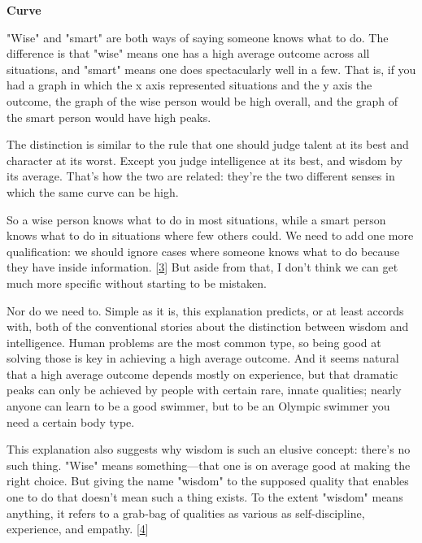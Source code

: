\textbf{Curve}

"Wise" and "smart" are both ways of saying
                  someone knows what to do. The difference is that "wise" means
                  one has a high average outcome across all situations, and
                  "smart" means one does spectacularly well in a few. That is,
                  if you had a graph in which the x axis represented situations
                  and the y axis the outcome, the graph of the wise person would
                  be high overall, and the graph of the smart person would have
                  high peaks.

The distinction is similar to the rule
                  that one should judge talent at its best and character at its
                  worst. Except you judge intelligence at its best, and wisdom
                  by its average. That's how the two are related: they're the
                  two different senses in which the same curve can be high.

So
                  a wise person knows what to do in most situations, while a
                  smart person knows what to do in situations where few others
                  could. We need to add one more qualification: we should ignore
                  cases where someone knows what to do because they have inside
                  information.
                  [\href{\#f3n}{3}]
                  But aside from that, I don't think we can get much more
                  specific without starting to be mistaken.

Nor do we
                  need to. Simple as it is, this explanation predicts, or at
                  least accords with, both of the conventional stories about the
                  distinction between wisdom and intelligence. Human problems
                  are the most common type, so being good at solving those is
                  key in achieving a high average outcome. And it seems natural
                  that a high average outcome depends mostly on experience, but
                  that dramatic peaks can only be achieved by people with
                  certain rare, innate qualities; nearly anyone can learn to be
                  a good swimmer, but to be an Olympic swimmer you need a
                  certain body type.

This explanation also suggests
                  why wisdom is such an elusive concept: there's no such thing.
                  "Wise" means something---that one is on average good at
                  making the right choice. But giving the name "wisdom" to the
                  supposed quality that enables one to do that doesn't mean such
                  a thing exists. To the extent "wisdom" means anything, it
                  refers to a grab-bag of qualities as various as
                  self-discipline, experience, and empathy.
                  [\href{\#f4n}{4}]


